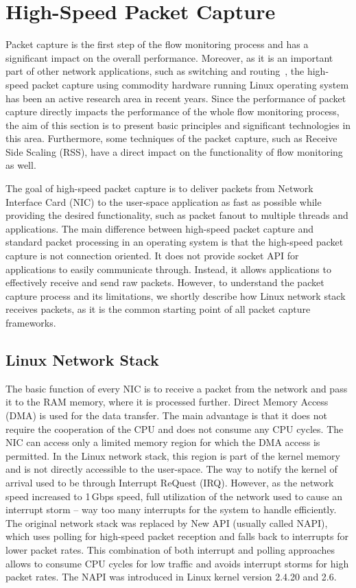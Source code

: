 \section{High-Speed Packet Capture}\label{sec:performance-capture}

Packet capture is the first step of the flow monitoring process and has a significant impact on the overall performance. Moreover, as it is an important part of other network applications, such as switching and routing~\cite{Kawashima-2016-Host}, the high-speed packet capture using commodity hardware running Linux operating system has been an active research area in recent years. Since the performance of packet capture directly impacts the performance of the whole flow monitoring process, the aim of this section is to present basic principles and significant technologies in this area. Furthermore, some techniques of the packet capture, such as Receive Side Scaling (RSS), have a direct impact on the functionality of flow monitoring as well.

The goal of high-speed packet capture is to deliver packets from Network Interface Card (NIC) to the user-space application as fast as possible while providing the desired functionality, such as packet fanout to multiple threads and applications. The main difference between high-speed packet capture and standard packet processing in an operating system is that the high-speed packet capture is not connection oriented. It does not provide socket API for applications to easily communicate through. Instead, it allows applications to effectively receive and send raw packets. However, to understand the packet capture process and its limitations, we shortly describe how Linux network stack receives packets, as it is the common starting point of all packet capture frameworks.

\subsection{Linux Network Stack}

The basic function of every NIC is to receive a packet from the network and pass it to the RAM memory, where it is processed further. Direct Memory Access (DMA) is used for the data transfer. The main advantage is that it does not require the cooperation of the CPU and does not consume any CPU cycles. The NIC can access only a limited memory region for which the DMA access is permitted. In the Linux network stack, this region is part of the kernel memory and is not directly accessible to the user-space. The way to notify the kernel of arrival used to be through Interrupt ReQuest (IRQ). However, as the network speed increased to 1\,Gbps speed, full utilization of the network used to cause an interrupt storm -- way too many interrupts for the system to handle efficiently. The original network stack was replaced by New API (usually called NAPI), which uses polling for high-speed packet reception and falls back to interrupts for lower packet rates. This combination of both interrupt and polling approaches allows to consume CPU cycles for low traffic and avoids interrupt storms for high packet rates. The NAPI was introduced in Linux kernel version 2.4.20 and 2.6.

